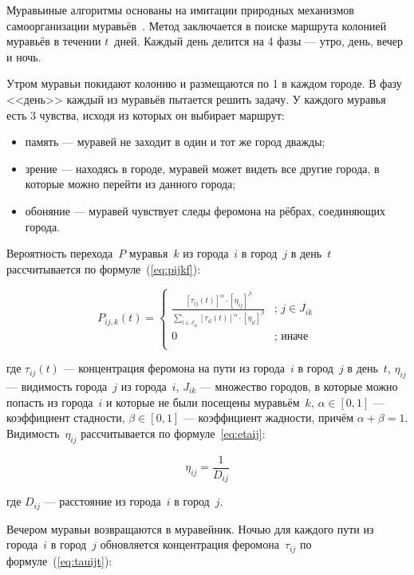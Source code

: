 Муравьиные алгоритмы основаны на имитации природных механизмов самоорганизации муравьёв~\cite{ants}. Метод заключается в поиске маршрута колонией муравьёв в течении $t$~дней.
Каждый день делится на 4 фазы --- утро, день, вечер и ночь. 

Утром муравьи покидают колонию и размещаются по 1 в каждом городе. В фазу <<день>> каждый из муравьёв пытается решить задачу. У каждого муравья есть 3 чувства, исходя из которых он выбирает маршрут:

\begin{itemize}
	\item память --- муравей не заходит в один и тот же город дважды;
	\item зрение --- находясь в городе, муравей может видеть все другие города, в которые можно перейти из данного города;
	\item обоняние --- муравей чувствует следы феромона на рёбрах, соединяющих города.
\end{itemize}

Вероятность перехода~$P$ муравья~$k$ из города~$i$ в город~$j$ в день~$t$ рассчитывается по формуле~(\ref{eq:pijkf}):

\begin{equation}
	\label{eq:pijkf}
	P_{ij,k}(t) = \begin{cases}
		\frac{[\tau_{ij}(t)]^\alpha\cdot[\eta_{ij}]^\beta}{\sum_{l \in J_{ik}} [\tau_{il}(t)]^\alpha\cdot[\eta_{il}]^\beta} &\text{; } j \in J_{ik}\\
		0 &\text{; иначе}\\
	\end{cases}
\end{equation}

\noindent где $\tau_{ij}(t)$ --- концентрация феромона на пути из города~$i$ в город~$j$ в день~$t$, $\eta_{ij}$ --- видимость города~$j$ из города~$i$, $J_{ik}$ --- множество городов, в которые можно попасть из города~$i$ и которые не были посещены муравьём~$k$, $\alpha \in [0, 1]$ --- коэффициент стадности, $\beta \in [0, 1]$ --- коэффициент жадности, причём $\alpha + \beta = 1$. Видимость~$\eta_{ij}$ рассчитывается по формуле~\ref{eq:etaij}:

\begin{equation}
	\label{eq:etaij}
	\eta_{ij} = \frac{1}{D_{ij}}
\end{equation}

\noindent где $D_{ij}$ --- расстояние из города~$i$ в город~$j$.

Вечером муравьи возвращаются в муравейник. Ночью для каждого пути из города~$i$ в город~$j$ обновляется концентрация феромона~$\tau_{ij}$ по формуле~(\ref{eq:tauijt}):

